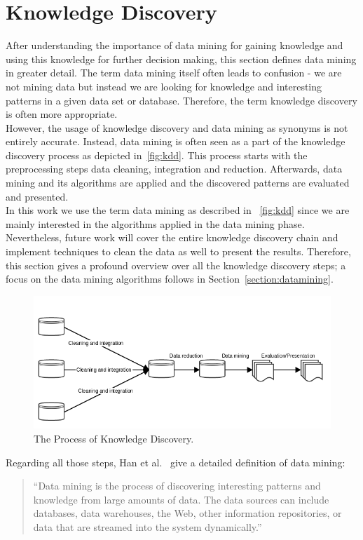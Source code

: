 \section{Knowledge Discovery}

After understanding the importance of data mining for gaining knowledge and using this knowledge for further decision making, this section defines data mining in greater detail. The term data mining itself often leads to confusion - we are not mining data but instead we are looking for knowledge and interesting patterns in a given data set or database. Therefore, the term knowledge discovery is often more appropriate.
\\
However, the usage of knowledge discovery and data mining as synonyms is not entirely accurate. Instead, data mining is often seen as a part of the knowledge discovery process as depicted in~\autoref{fig:kdd}. This process starts with the preprocessing steps data cleaning, integration and reduction. Afterwards, data mining and its algorithms are applied and the discovered patterns are evaluated and presented. 
\\
In this work we use the term data mining as described in ~\autoref{fig:kdd} since we are mainly interested in the algorithms applied in the data mining phase. Nevertheless, future work will cover the entire knowledge discovery chain and implement techniques to clean the data as well to present the results. Therefore, this section gives a profound overview over all the knowledge discovery steps; a focus on the data mining algorithms follows in Section~\ref{section:datamining}.


\begin{figure}[htsb]
  \centerline{
    \includegraphics[scale=0.6]{figures/kdd}
  }
  \caption[The Process of Knowledge Discovery]{The Process of Knowledge Discovery.}\label{fig:kdd}
\end{figure}


Regarding all those steps, Han et al.~\parencite[8]{dmbook} give a detailed definition of data mining: 
\begin{quote}
“Data mining is the process of discovering interesting patterns and knowledge from large amounts of data. The data sources can include databases, data warehouses, the Web, other information repositories, or data that are streamed into the system dynamically.”
\end{quote}

